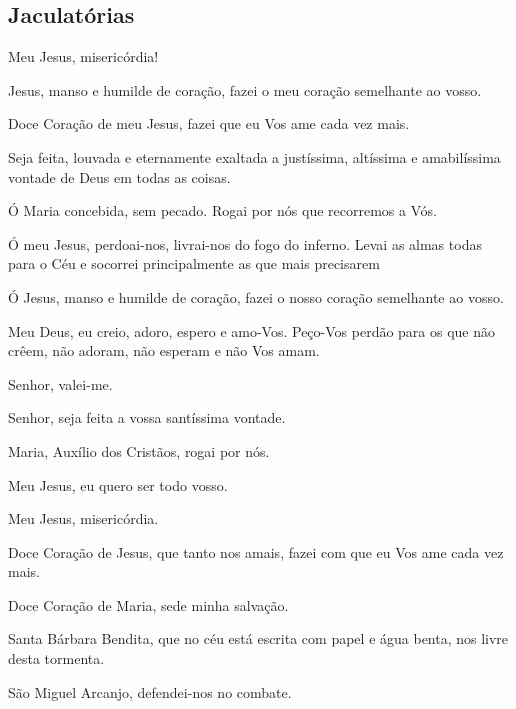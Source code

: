 \subsection{Jaculatórias}
Meu Jesus, misericórdia!\par
Jesus, manso e humilde de coração, fazei o meu coração semelhante ao vosso.\par
Doce Coração de meu Jesus, fazei que eu Vos ame cada vez mais.\par
Seja feita, louvada e eternamente exaltada a justíssima, altíssima e amabilíssima vontade de Deus em todas as coisas.\par
Ó Maria concebida, sem pecado. Rogai por nós que recorremos a Vós.\par
Ó meu Jesus, perdoai-nos, livrai-nos do fogo do inferno. Levai as almas
todas para o Céu e socorrei principalmente as que mais precisarem\par
Ó Jesus, manso e humilde de coração, fazei o nosso coração semelhante
ao vosso.\par
Meu Deus, eu creio, adoro, espero e amo-Vos. Peço-Vos perdão para os que
não crêem, não adoram, não esperam e não Vos amam.\par
Senhor, valei-me.\par
Senhor, seja feita a vossa santíssima vontade.\par
Maria, Auxílio dos Cristãos, rogai por nós.\par
Meu Jesus, eu quero ser todo vosso.\par
Meu Jesus, misericórdia.\par
Doce Coração de Jesus, que tanto nos amais, fazei com que eu Vos ame cada vez mais.\par
Doce Coração de Maria, sede minha salvação.\par
Santa Bárbara Bendita, que no céu está escrita com papel e água benta, nos livre desta tormenta.\par
São Miguel Arcanjo, defendei-nos no combate.\par

